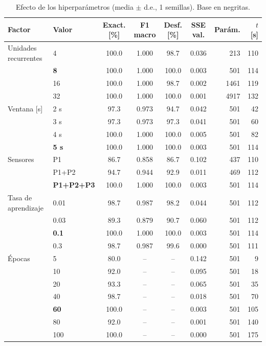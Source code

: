 \begin{table}[t]
\centering
\caption{Efecto de los hiperparámetros (media $\pm$ d.e., 1 semillas). Base en negritas.}
\label{tab:hiper}
\scriptsize
\setlength{\tabcolsep}{5pt}
\begin{tabular}{llccccrr}
\toprule
Factor & Valor & Exact. [\%] & F1 macro & Desf. [\%] & SSE val. & Parám. & $t$ [s] \\
\midrule
Unidades recurrentes & 4 & 100.0 & 1.000 & 98.7 & 0.036 & 213 & 110 \\
 & \textbf{8} & 100.0 & 1.000 & 100.0 & 0.003 & 501 & 114 \\
 & 16 & 100.0 & 1.000 & 98.7 & 0.002 & 1461 & 119 \\
 & 32 & 100.0 & 1.000 & 100.0 & 0.001 & 4917 & 132 \\
\midrule
Ventana [s] & 2 s & 97.3 & 0.973 & 94.7 & 0.042 & 501 & 42 \\
 & 3 s & 97.3 & 0.973 & 97.3 & 0.041 & 501 & 60 \\
 & 4 s & 100.0 & 1.000 & 100.0 & 0.005 & 501 & 82 \\
 & \textbf{5 s} & 100.0 & 1.000 & 100.0 & 0.003 & 501 & 114 \\
\midrule
Sensores & P1 & 86.7 & 0.858 & 86.7 & 0.102 & 437 & 110 \\
 & P1+P2 & 94.7 & 0.944 & 92.9 & 0.011 & 469 & 112 \\
 & \textbf{P1+P2+P3} & 100.0 & 1.000 & 100.0 & 0.003 & 501 & 114 \\
\midrule
Tasa de aprendizaje & 0.01 & 98.7 & 0.987 & 98.2 & 0.044 & 501 & 112 \\
 & 0.03 & 89.3 & 0.879 & 90.7 & 0.060 & 501 & 112 \\
 & \textbf{0.1} & 100.0 & 1.000 & 100.0 & 0.003 & 501 & 114 \\
 & 0.3 & 98.7 & 0.987 & 99.6 & 0.000 & 501 & 111 \\
\midrule
Épocas & 5 & 80.0 & -- & -- & 0.142 & 501 & 9 \\
 & 10 & 92.0 & -- & -- & 0.095 & 501 & 18 \\
 & 20 & 93.3 & -- & -- & 0.065 & 501 & 35 \\
 & 40 & 98.7 & -- & -- & 0.018 & 501 & 70 \\
 & \textbf{60} & 100.0 & -- & -- & 0.003 & 501 & 105 \\
 & 80 & 92.0 & -- & -- & 0.001 & 501 & 140 \\
 & 100 & 100.0 & -- & -- & 0.000 & 501 & 175 \\
\bottomrule
\end{tabular}
\end{table}
